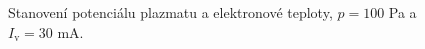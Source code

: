 \documentclass[a4paper,12pt]{article}
\begin{document}
\begin{figure}[h]
	\centering
	\begin{subfigure}[b]{.49\textwidth}
		\centering
	\end{subfigure}
	\begin{subfigure}[b]{.49\textwidth}
		\centering
	\end{subfigure}
	\caption{Stanovení potenciálu plazmatu a elektronové teploty, $p = 100$ \si{\pascal} a $I_\text{v} = 30$ \si{\milli\ampere}.}
	\label{data1}
\end{figure}
\end{document}
